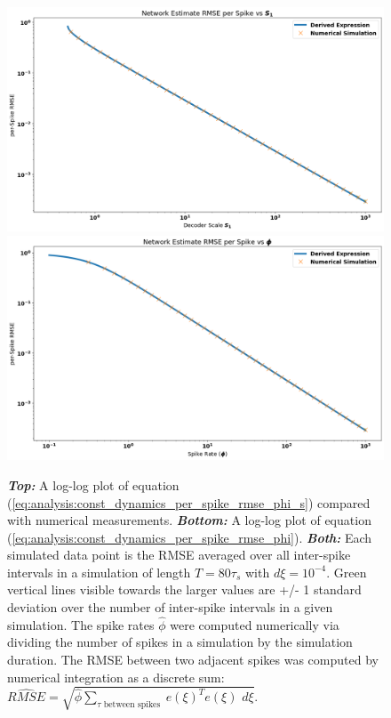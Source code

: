 \begin{enumerate}
\begin{figure}
\centering
\includegraphics[width=\linewidth]{figures/rmse_sp_vs_s_const_driving.png}
\centering
\includegraphics[width=\linewidth]{figures/rmse_sp_vs_phi_s_const_driving.png}
\caption{\textbf{\textit{Top:}} A log-log plot of equation (\ref{eq:analysis:const_dynamics_per_spike_rmse_phi_s}) compared with numerical measurements.  \textbf{\textit{Bottom:}} A log-log plot of equation (\ref{eq:analysis:const_dynamics_per_spike_rmse_phi}).
\textbf{\textit{Both:}} Each simulated data point is the RMSE averaged over all inter-spike intervals in a simulation of length $T = 80 \tau_s$ with $d\xi = 10^{-4}$. Green vertical lines visible towards the larger values are +/- 1 standard deviation over the number of inter-spike intervals in a given simulation. The spike rates $\hat{\phi}$ were computed numerically via dividing the number of spikes in a simulation by the simulation duration. The RMSE between two adjacent spikes was computed by numerical integration as a discrete sum: $\hat{RMSE} = \sqrt{\hat{\phi} \sum_{\tau \text{ between spikes }} e(\xi)^T e(\xi) \, \, d\xi }$.}
\label{fig:analysis:const_dynamics_per_spike_rmse_vs_phi_s}
\end{figure}


 





\end{enumerate}
